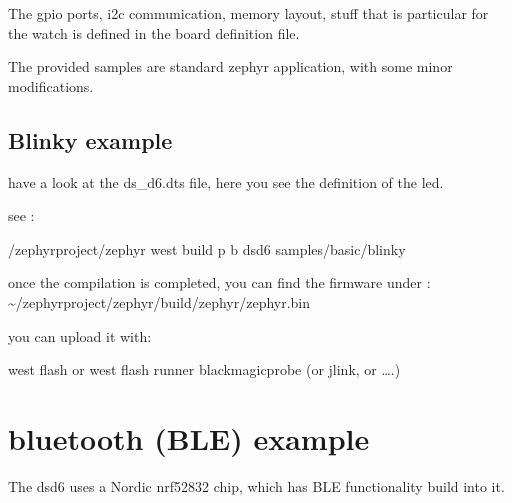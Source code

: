 \documentclass[letterpaper,10pt,english]{sphinxmanual}
\begin{document}
The gpio ports, i2c communication, memory layout, stuff that is particular for the watch is defined in the board definition file.

The provided samples are standard zephyr application, with some minor modifications.


\section{Blinky    example}
\label{\detokenize{basicapplications:blinky-example}}
\begin{sphinxVerbatim}[commandchars=\\\{\}]
               

         
\end{sphinxVerbatim}

have a look at the ds\_d6.dts file, here you see the definition of the led.


see : 

\begin{sphinxVerbatim}[commandchars=\\\{\}]
  \PYGZti{}/zephyrproject/zephyr
 west build \PYGZhy{}p \PYGZhy{}b ds\PYGZus{}d6 samples/basic/blinky
\end{sphinxVerbatim}

once the compilation is completed,  you can find the firmware under :
\textasciitilde{}/zephyrproject/zephyr/build/zephyr/zephyr.bin

you can upload it with:

west flash
or
west flash \textendash{}runner blackmagicprobe (or jlink, or ….)


\chapter{bluetooth (BLE) example}
\label{\detokenize{bluetooth:bluetooth-ble-example}}\label{\detokenize{bluetooth::doc}}
The ds\sphinxhyphen{}d6 uses a Nordic nrf52832 chip, which has BLE functionality build into it.
\end{document}

